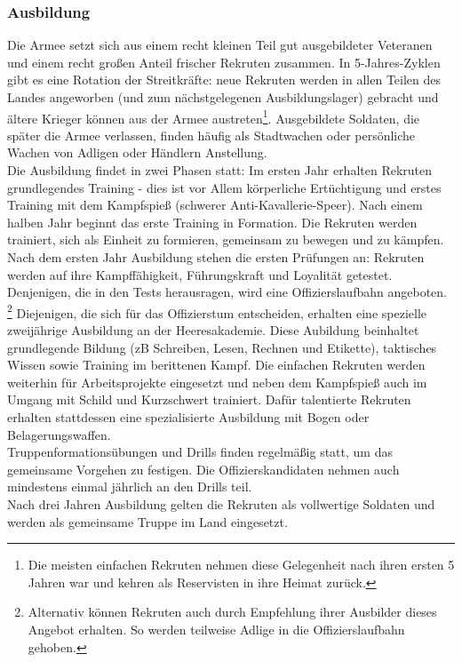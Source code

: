 \subsubsection{Ausbildung}
Die Armee setzt sich aus einem recht kleinen Teil gut ausgebildeter Veteranen und einem recht großen Anteil frischer Rekruten zusammen. 
In 5-Jahres-Zyklen gibt es eine Rotation der Streitkräfte: neue Rekruten werden in allen Teilen des Landes angeworben 
(und zum nächstgelegenen Ausbildungslager) gebracht und ältere Krieger können aus der Armee austreten\footnote{Die meisten einfachen Rekruten 
nehmen diese Gelegenheit nach ihren ersten 5 Jahren war und kehren als Reservisten in ihre Heimat zurück.}. Ausgebildete Soldaten, die später die Armee verlassen, 
finden häufig als Stadtwachen oder persönliche Wachen von Adligen oder Händlern Anstellung.\\
Die Ausbildung findet in zwei Phasen statt: Im ersten Jahr erhalten Rekruten grundlegendes Training - dies ist vor Allem körperliche 
Ertüchtigung und erstes Training mit dem Kampfspieß (schwerer Anti-Kavallerie-Speer). 
Nach einem halben Jahr beginnt das erste Training in Formation. Die Rekruten werden trainiert, sich als Einheit zu formieren, gemeinsam zu bewegen und zu kämpfen. 
Nach dem ersten Jahr Ausbildung stehen die ersten Prüfungen an: Rekruten werden auf ihre Kampffähigkeit, Führungskraft und Loyalität getestet. 
Denjenigen, die in den Tests herausragen, wird eine Offizierslaufbahn angeboten.
\footnote{Alternativ können Rekruten auch durch Empfehlung ihrer Ausbilder dieses Angebot erhalten. So werden teilweise Adlige in die Offizierslaufbahn gehoben.} 
Diejenigen, die sich für das Offizierstum entscheiden, erhalten eine spezielle zweijährige Ausbildung an der Heeresakademie. 
Diese Aubildung beinhaltet grundlegende Bildung (zB Schreiben, Lesen, Rechnen und Etikette), taktisches Wissen sowie Training im berittenen Kampf. 
Die einfachen Rekruten werden weiterhin für Arbeitsprojekte eingesetzt und neben dem Kampfspieß auch im Umgang mit Schild und Kurzschwert trainiert. 
Dafür talentierte Rekruten erhalten stattdessen eine spezialisierte Ausbildung mit Bogen oder Belagerungswaffen.\\
Truppenformationsübungen und Drills finden regelmäßig statt, um das gemeinsame Vorgehen zu festigen. 
Die Offizierskandidaten nehmen auch mindestens einmal jährlich an den Drills teil. \\
Nach drei Jahren Ausbildung gelten die Rekruten als vollwertige Soldaten und werden als gemeinsame Truppe im Land eingesetzt.

